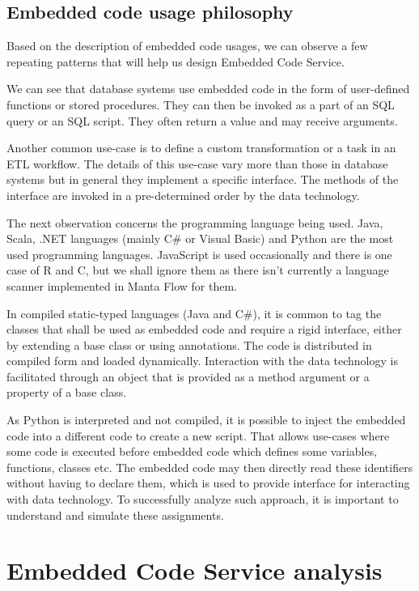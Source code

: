 \subsection{Embedded code usage philosophy}
Based on the description of embedded code usages, we can observe a few repeating patterns that will help us design Embedded Code Service.
\par
We can see that database systems use embedded code in the form of user-defined functions or stored procedures. They can then be invoked as a part of an SQL query or an SQL script. They often return a value and may receive arguments.
\par
Another common use-case is to define a custom transformation or a task in an ETL workflow. The details of this use-case vary more than those in database systems but in general they implement a specific interface. The methods of the interface are invoked in a pre-determined order by the data technology.
\par
The next observation concerns the programming language being used. Java, Scala, .NET languages (mainly C\# or Visual Basic) and Python are the most used programming languages. JavaScript is used occasionally and there is one case of R and C, but we shall ignore them as there isn't currently a language scanner implemented in Manta Flow for them.
\par
In compiled static-typed languages (Java and C\#), it is common to tag the classes that shall be used as embedded code and require a rigid interface, either by extending a base class or using annotations. The code is distributed in compiled form and loaded dynamically. Interaction with the data technology is facilitated through an object that is provided as a method argument or a property of a base class.
\par
As Python is interpreted and not compiled, it is possible to inject the embedded code into a different code to create a new script. That allows use-cases where some code is executed before embedded code which defines some variables, functions, classes etc. The embedded code may then directly read these identifiers without having to declare them, which is used to provide interface for interacting with data technology. To successfully analyze such approach, it is important to understand and simulate these assignments.

\section{Embedded Code Service analysis}

